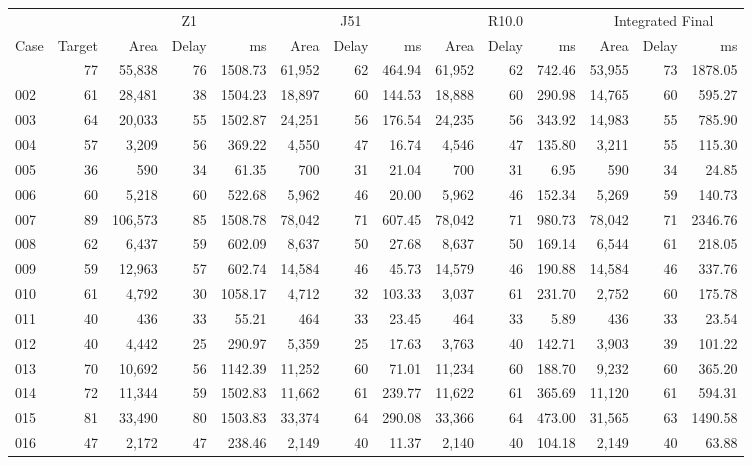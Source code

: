 {\begin{longtable}{@{}lr*{4}{rrr}@{}}
\midrule
\endfirsthead
\toprule
 & & \multicolumn{3}{c}{Z1} & \multicolumn{3}{c}{J51} & \multicolumn{3}{c}{R10.0} & \multicolumn{3}{c}{Integrated Final} \\
\cmidrule(lr){3-5}\cmidrule(lr){6-8}\cmidrule(lr){9-11}\cmidrule(lr){12-14}
Case & Target & Area & Delay & ms & Area & Delay & ms & Area & Delay & ms & Area & Delay & ms \\
\midrule
\endhead
\bottomrule
\endlastfoot
001 & 77 & 55,838 & 76 & 1508.73 & 61,952 & 62 & 464.94 & 61,952 & 62 & 742.46 & 53,955 & 73 & 1878.05 \\
002 & 61 & 28,481 & 38 & 1504.23 & 18,897 & 60 & 144.53 & 18,888 & 60 & 290.98 & 14,765 & 60 & 595.27 \\
003 & 64 & 20,033 & 55 & 1502.87 & 24,251 & 56 & 176.54 & 24,235 & 56 & 343.92 & 14,983 & 55 & 785.90 \\
004 & 57 & 3,209 & 56 & 369.22 & 4,550 & 47 & 16.74 & 4,546 & 47 & 135.80 & 3,211 & 55 & 115.30 \\
005 & 36 & 590 & 34 & 61.35 & 700 & 31 & 21.04 & 700 & 31 & 6.95 & 590 & 34 & 24.85 \\
006 & 60 & 5,218 & 60 & 522.68 & 5,962 & 46 & 20.00 & 5,962 & 46 & 152.34 & 5,269 & 59 & 140.73 \\
007 & 89 & 106,573 & 85 & 1508.78 & 78,042 & 71 & 607.45 & 78,042 & 71 & 980.73 & 78,042 & 71 & 2346.76 \\
008 & 62 & 6,437 & 59 & 602.09 & 8,637 & 50 & 27.68 & 8,637 & 50 & 169.14 & 6,544 & 61 & 218.05 \\
009 & 59 & 12,963 & 57 & 602.74 & 14,584 & 46 & 45.73 & 14,579 & 46 & 190.88 & 14,584 & 46 & 337.76 \\
010 & 61 & 4,792 & 30 & 1058.17 & 4,712 & 32 & 103.33 & 3,037 & 61 & 231.70 & 2,752 & 60 & 175.78 \\
011 & 40 & 436 & 33 & 55.21 & 464 & 33 & 23.45 & 464 & 33 & 5.89 & 436 & 33 & 23.54 \\
012 & 40 & 4,442 & 25 & 290.97 & 5,359 & 25 & 17.63 & 3,763 & 40 & 142.71 & 3,903 & 39 & 101.22 \\
013 & 70 & 10,692 & 56 & 1142.39 & 11,252 & 60 & 71.01 & 11,234 & 60 & 188.70 & 9,232 & 60 & 365.20 \\
014 & 72 & 11,344 & 59 & 1502.83 & 11,662 & 61 & 239.77 & 11,622 & 61 & 365.69 & 11,120 & 61 & 594.31 \\
015 & 81 & 33,490 & 80 & 1503.83 & 33,374 & 64 & 290.08 & 33,366 & 64 & 473.00 & 31,565 & 63 & 1490.58 \\
016 & 47 & 2,172 & 47 & 238.46 & 2,149 & 40 & 11.37 & 2,140 & 40 & 104.18 & 2,149 & 40 & 63.88 \\

\end{longtable}}
